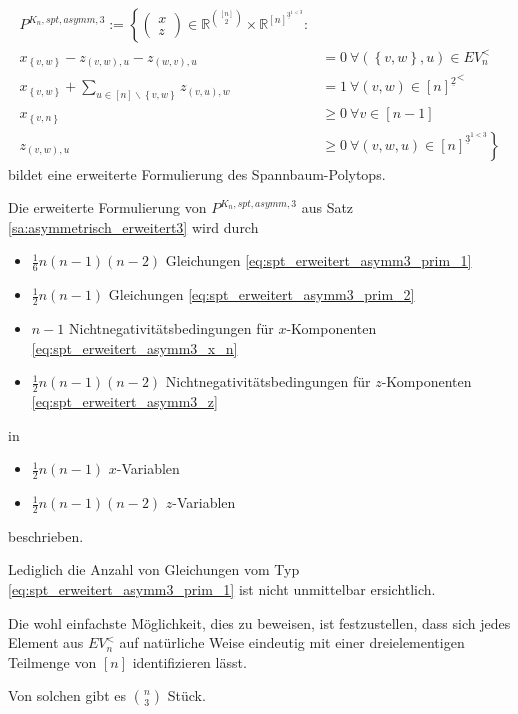 \documentclass[10p,a4paper,BCOR = 12mm, DIV=15]{scrbook}
\begin{document}
\begin{Sa}
\label{sa:asymmetrisch_erweitert3}
\begin{align}
P^{K_n, spt, asymm, 3} := \left\{
\left(\begin{array}{c}
x \\
z
\end{array}\right)\in \mathbb{R}^{[n]\choose 2}\times \mathbb{R}^{\left[n\right]^{\underline{3}^{1<3}}}: \nonumber\right. \\
x_{\left\{v, w\right\}} - z_{\left(v, w\right), u} - z_{\left(w, v\right), u} & = 0\ \forall \left(\left\{v, w\right\}, u\right)\in EV_n^< \label{eq:spt_erweitert_asymm3_prim_1} \\
x_{\left\{v, w\right\}} + \sum_{u\in[n]\backslash\left\{v, w\right\}} z_{\left(v, u\right), w} & = 1\ \forall \left(v, w\right)\in {[n]^{\underline{2}}}^< \label{eq:spt_erweitert_asymm3_prim_2} \\
x_{\left\{v, n\right\}} & \geq 0 \ \forall v\in \left[n-1\right] \label{eq:spt_erweitert_asymm3_x_n} \\
z_{\left(v, w\right), u} & \left. \geq 0 \ \forall \left(v, w, u\right)\in \left[n\right]^{\underline{3}^{1<3}} \label{eq:spt_erweitert_asymm3_z} \right\}
\end{align}
bildet eine erweiterte Formulierung des Spannbaum-Polytops.
\end{Sa}

\begin{Bem}
Die erweiterte Formulierung von $P^{K_n, spt, asymm, 3}$ aus Satz \ref{sa:asymmetrisch_erweitert3} wird durch
\begin{itemize}
\item $\frac{1}{6} n \left(n-1\right) \left(n-2\right)$ Gleichungen \eqref{eq:spt_erweitert_asymm3_prim_1}
\item $\frac{1}{2} n \left(n-1\right)$ Gleichungen \eqref{eq:spt_erweitert_asymm3_prim_2}
\item $n-1$ Nichtnegativitätsbedingungen für $x$-Komponenten \eqref{eq:spt_erweitert_asymm3_x_n}
\item $\frac{1}{2} n \left(n-1\right) \left(n-2\right)$ Nichtnegativitätsbedingungen für $z$-Komponenten \eqref{eq:spt_erweitert_asymm3_z}
\end{itemize}
in 
\begin{itemize}
\item $\frac{1}{2} n \left(n-1\right)$ $x$-Variablen
\item $\frac{1}{2} n \left(n-1\right) \left(n-2\right)$ $z$-Variablen
\end{itemize}
beschrieben.
\end{Bem}
\begin{bew}
Lediglich die Anzahl von Gleichungen vom Typ \eqref{eq:spt_erweitert_asymm3_prim_1} ist nicht unmittelbar ersichtlich.

Die wohl einfachste Möglichkeit, dies zu beweisen, ist festzustellen, dass sich jedes Element aus $EV_n^<$ auf natürliche Weise eindeutig mit einer dreielementigen Teilmenge von $\left[n\right]$ identifizieren lässt.

Von solchen gibt es $n \choose 3$ Stück.
\end{bew}
\end{document}
